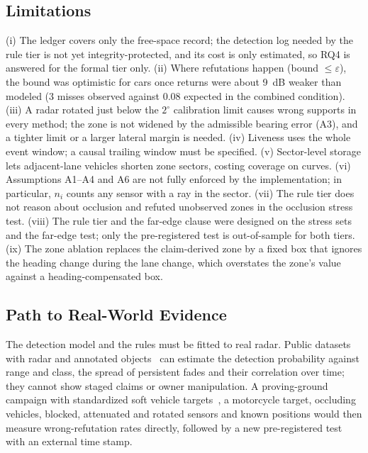 \subsection{Limitations}
(i) The ledger covers only the free-space record; the detection log needed by the rule tier is not yet integrity-protected, and its cost is only estimated, so RQ4 is answered for the formal tier only. (ii) Where refutations happen (bound $\le \varepsilon$), the bound was optimistic for cars once returns were about 9~dB weaker than modeled (3 misses observed against 0.08 expected in the combined condition). (iii) A radar rotated just below the $2^\circ$ calibration limit causes wrong supports in every method; the zone is not widened by the admissible bearing error (A3), and a tighter limit or a larger lateral margin is needed. (iv) Liveness uses the whole event window; a causal trailing window must be specified. (v) Sector-level storage lets adjacent-lane vehicles shorten zone sectors, costing coverage on curves. (vi) Assumptions A1--A4 and A6 are not fully enforced by the implementation; in particular, $n_i$ counts any sensor with a ray in the sector. (vii) The rule tier does not reason about occlusion and refuted unobserved zones in the occlusion stress test. (viii) The rule tier and the far-edge clause were designed on the stress sets and the far-edge test; only the pre-registered test is out-of-sample for both tiers. (ix) The zone ablation replaces the claim-derived zone by a fixed box that ignores the heading change during the lane change, which overstates the zone's value against a heading-compensated box.

\subsection{Path to Real-World Evidence}\label{sec:realworld}
The detection model and the rules must be fitted to real radar. Public datasets with radar and annotated objects~\cite{b57,b58} can estimate the detection probability against range and class, the spread of persistent fades and their correlation over time; they cannot show staged claims or owner manipulation. A proving-ground campaign with standardized soft vehicle targets~\cite{b59}, a motorcycle target, occluding vehicles, blocked, attenuated and rotated sensors and known positions would then measure wrong-refutation rates directly, followed by a new pre-registered test with an external time stamp.

